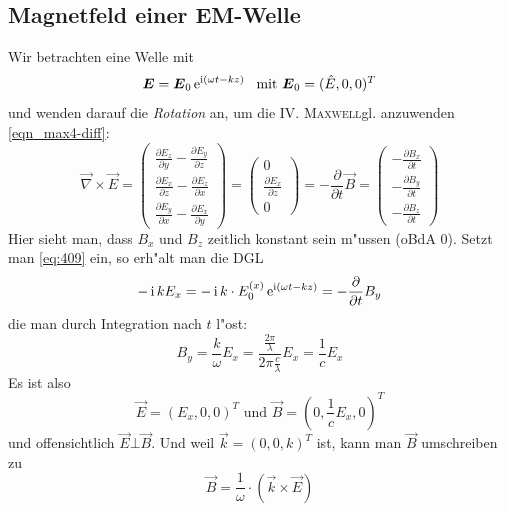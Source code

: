 





\subsection{Magnetfeld einer EM-Welle}
\label{kap_magnetfeld-em-welle}

Wir betrachten eine Welle mit
\begin{equation}
\label{eq:409}
   \boldsymbol{E} = \boldsymbol{E}_0 \operatorname{e}^{\operatorname{i}(\omega t - k z)} ~ \text{ mit } \boldsymbol{E}_0 =
   (\hat E,0,0)^T
\end{equation}
und wenden darauf die \emph{Rotation} an, um die
IV. \textsc{Maxwell}gl. anzuwenden \eqref{eqn_max4-diff}:
\begin{equation}
   \label{eq:408}
   \vec\nabla\times \vec E =
   \begin{pmatrix}
      \frac{\partial E_z}{\partial y} - \frac{\partial E_y}{\partial
        z}\\
      \frac{\partial E_x}{\partial z} - \frac{\partial E_z}{\partial
        x}\\
      \frac{\partial E_y}{\partial x} - \frac{\partial E_x}{\partial
        y}
   \end{pmatrix}
=
\begin{pmatrix}
   0\\\frac{\partial E_x}{\partial z}\\0
\end{pmatrix} = -\frac{\partial }{\partial t} \vec B =
\begin{pmatrix}
-   \frac{\partial B_x}{\partial t}\\
-   \frac{\partial B_y}{\partial t}\\
-   \frac{\partial B_z}{\partial t}
\end{pmatrix}
\end{equation}
Hier sieht man, dass $B_x$ und $B_z$ zeitlich konstant sein
m"ussen (oBdA $0$). Setzt man \eqref{eq:409} ein, so erh"alt man die DGL
\begin{equation}
   \label{eq:410}
   -\operatorname{i} k   E_x = -\operatorname{i} k  \cdot  E_0^{(x)} \operatorname{e}^{\operatorname{i}(\omega t - k z)}  = - \frac{\partial }{\partial t} B_y
\end{equation}
die man durch Integration nach $t$ l"ost:
\begin{equation*}
   \label{eq:411}
   B_y = \frac{k}{\omega}  E_x =
   \frac{\frac{2\pi}{\lambda}}{2\pi\frac{c}{\lambda}} E_x =
   \frac{1}{c} E_x
\end{equation*}
Es ist also
\begin{equation*}
   \label{eq:412}
   \vec E = (E_x, 0, 0)^T   \text{ und } \vec B = (0, \frac{1}{c} E_x, 0)^T
\end{equation*}
und offensichtlich $\vec E \bot \vec B$. Und weil $\vec k = (0, 0, k)^T$ ist, kann man $\vec B$ umschreiben zu
\begin{equation}
   \label{eq:413}
\boxed{ \vec B = \frac{1}{\omega} \cdot \left (\vec k \times \vec E \right)}
\end{equation}

